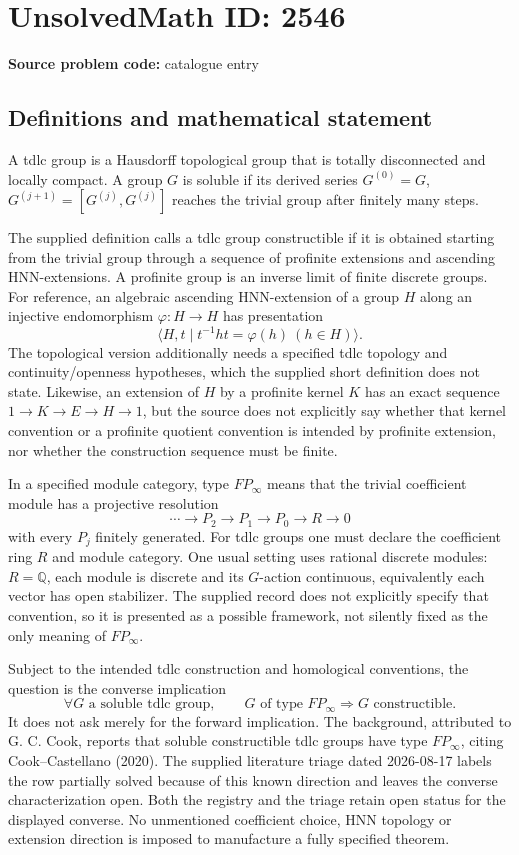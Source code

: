 \documentclass[11pt]{article}
\newcommand{\Q}{\mathbb{Q}}
\begin{document}
\section*{UnsolvedMath ID: 2546}
\textbf{Source problem code:} catalogue entry
\subsection{Definitions and mathematical statement}
A tdlc group is a Hausdorff topological group that is totally disconnected and locally compact. A group \(G\) is soluble if its derived series \(G^{(0)}=G\), \(G^{(j+1)}=[G^{(j)},G^{(j)}]\) reaches the trivial group after finitely many steps.

The supplied definition calls a tdlc group constructible if it is obtained starting from the trivial group through a sequence of profinite extensions and ascending HNN-extensions. A profinite group is an inverse limit of finite discrete groups. For reference, an algebraic ascending HNN-extension of a group \(H\) along an injective endomorphism \(\varphi:H\to H\) has presentation
\[
\langle H,t\mid t^{-1}ht=\varphi(h)\ (h\in H)\rangle.
\]
The topological version additionally needs a specified tdlc topology and continuity/openness hypotheses, which the supplied short definition does not state. Likewise, an extension of \(H\) by a profinite kernel \(K\) has an exact sequence \(1\to K\to E\to H\to1\), but the source does not explicitly say whether that kernel convention or a profinite quotient convention is intended by profinite extension, nor whether the construction sequence must be finite.

In a specified module category, type \(FP_\infty\) means that the trivial coefficient module has a projective resolution
\[
\cdots\longrightarrow P_2\longrightarrow P_1\longrightarrow P_0
\longrightarrow R\longrightarrow0
\]
with every \(P_j\) finitely generated. For tdlc groups one must declare the coefficient ring \(R\) and module category. One usual setting uses rational discrete modules: \(R=\Q\), each module is discrete and its \(G\)-action continuous, equivalently each vector has open stabilizer. The supplied record does not explicitly specify that convention, so it is presented as a possible framework, not silently fixed as the only meaning of \(FP_\infty\).

Subject to the intended tdlc construction and homological conventions, the question is the converse implication
\[
\forall G\text{ a soluble tdlc group},\qquad
G\text{ of type }FP_\infty\Longrightarrow G\text{ constructible}.
\]
It does not ask merely for the forward implication. The background, attributed to G. C. Cook, reports that soluble constructible tdlc groups have type \(FP_\infty\), citing Cook--Castellano (2020). The supplied literature triage dated 2026-08-17 labels the row partially solved because of this known direction and leaves the converse characterization open. Both the registry and the triage retain open status for the displayed converse. No unmentioned coefficient choice, HNN topology or extension direction is imposed to manufacture a fully specified theorem.
\end{document}
